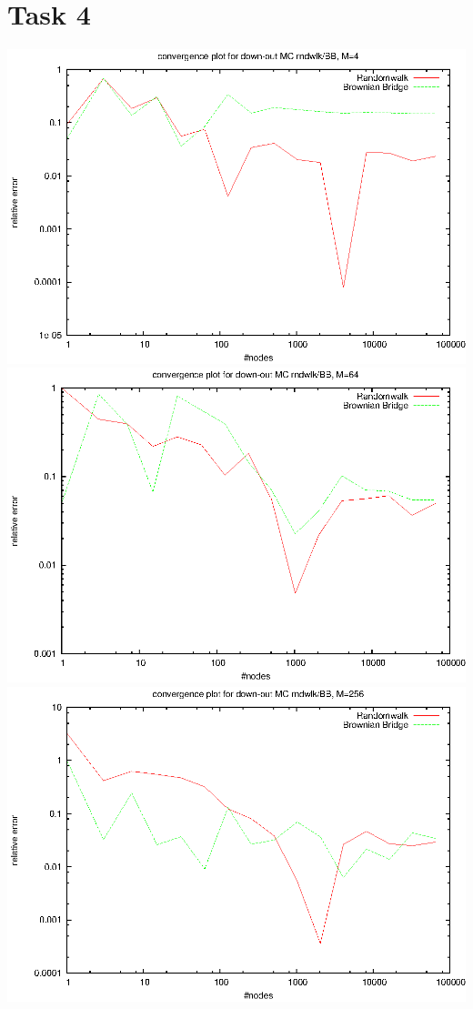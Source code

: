 \documentclass[]{article}
\begin{document}
\section*{Task 4}
\includegraphics[width=.9\textwidth]{task4_mc_4.eps}\\
\includegraphics[width=.9\textwidth]{task4_mc_64.eps}\\
\includegraphics[width=.9\textwidth]{task4_mc_256.eps}\\
\end{document}
